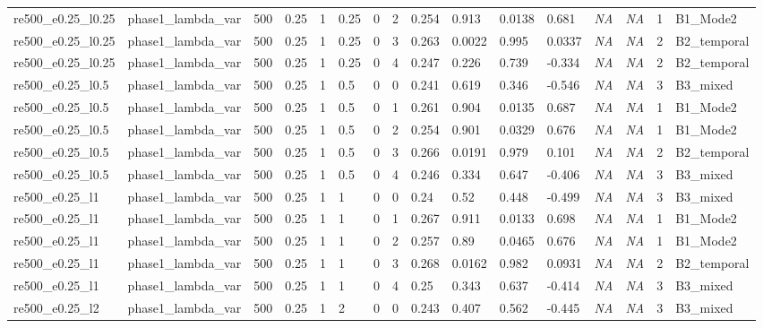 \documentclass[11pt,a4paper]{article}
\begin{document}
\begin{landscape}
\begin{longtable}{*{16}{l}}
    re500\_e0.25\_l0.25 & phase1\_lambda\_var & 500 & 0.25 & 1 & 0.25 & 0 & 2 & 0.254 & 0.913 & 0.0138 & 0.681 & \textit{NA} & \textit{NA} & 1 & B1\_Mode2 \\
    re500\_e0.25\_l0.25 & phase1\_lambda\_var & 500 & 0.25 & 1 & 0.25 & 0 & 3 & 0.263 & 0.0022 & 0.995 & 0.0337 & \textit{NA} & \textit{NA} & 2 & B2\_temporal \\
    re500\_e0.25\_l0.25 & phase1\_lambda\_var & 500 & 0.25 & 1 & 0.25 & 0 & 4 & 0.247 & 0.226 & 0.739 & -0.334 & \textit{NA} & \textit{NA} & 2 & B2\_temporal \\
    re500\_e0.25\_l0.5 & phase1\_lambda\_var & 500 & 0.25 & 1 & 0.5 & 0 & 0 & 0.241 & 0.619 & 0.346 & -0.546 & \textit{NA} & \textit{NA} & 3 & B3\_mixed \\
    re500\_e0.25\_l0.5 & phase1\_lambda\_var & 500 & 0.25 & 1 & 0.5 & 0 & 1 & 0.261 & 0.904 & 0.0135 & 0.687 & \textit{NA} & \textit{NA} & 1 & B1\_Mode2 \\
    re500\_e0.25\_l0.5 & phase1\_lambda\_var & 500 & 0.25 & 1 & 0.5 & 0 & 2 & 0.254 & 0.901 & 0.0329 & 0.676 & \textit{NA} & \textit{NA} & 1 & B1\_Mode2 \\
    re500\_e0.25\_l0.5 & phase1\_lambda\_var & 500 & 0.25 & 1 & 0.5 & 0 & 3 & 0.266 & 0.0191 & 0.979 & 0.101 & \textit{NA} & \textit{NA} & 2 & B2\_temporal \\
    re500\_e0.25\_l0.5 & phase1\_lambda\_var & 500 & 0.25 & 1 & 0.5 & 0 & 4 & 0.246 & 0.334 & 0.647 & -0.406 & \textit{NA} & \textit{NA} & 3 & B3\_mixed \\
    re500\_e0.25\_l1 & phase1\_lambda\_var & 500 & 0.25 & 1 & 1 & 0 & 0 & 0.24 & 0.52 & 0.448 & -0.499 & \textit{NA} & \textit{NA} & 3 & B3\_mixed \\
    re500\_e0.25\_l1 & phase1\_lambda\_var & 500 & 0.25 & 1 & 1 & 0 & 1 & 0.267 & 0.911 & 0.0133 & 0.698 & \textit{NA} & \textit{NA} & 1 & B1\_Mode2 \\
    re500\_e0.25\_l1 & phase1\_lambda\_var & 500 & 0.25 & 1 & 1 & 0 & 2 & 0.257 & 0.89 & 0.0465 & 0.676 & \textit{NA} & \textit{NA} & 1 & B1\_Mode2 \\
    re500\_e0.25\_l1 & phase1\_lambda\_var & 500 & 0.25 & 1 & 1 & 0 & 3 & 0.268 & 0.0162 & 0.982 & 0.0931 & \textit{NA} & \textit{NA} & 2 & B2\_temporal \\
    re500\_e0.25\_l1 & phase1\_lambda\_var & 500 & 0.25 & 1 & 1 & 0 & 4 & 0.25 & 0.343 & 0.637 & -0.414 & \textit{NA} & \textit{NA} & 3 & B3\_mixed \\
    re500\_e0.25\_l2 & phase1\_lambda\_var & 500 & 0.25 & 1 & 2 & 0 & 0 & 0.243 & 0.407 & 0.562 & -0.445 & \textit{NA} & \textit{NA} & 3 & B3\_mixed \\

\end{longtable}
\end{landscape}
\end{document}

